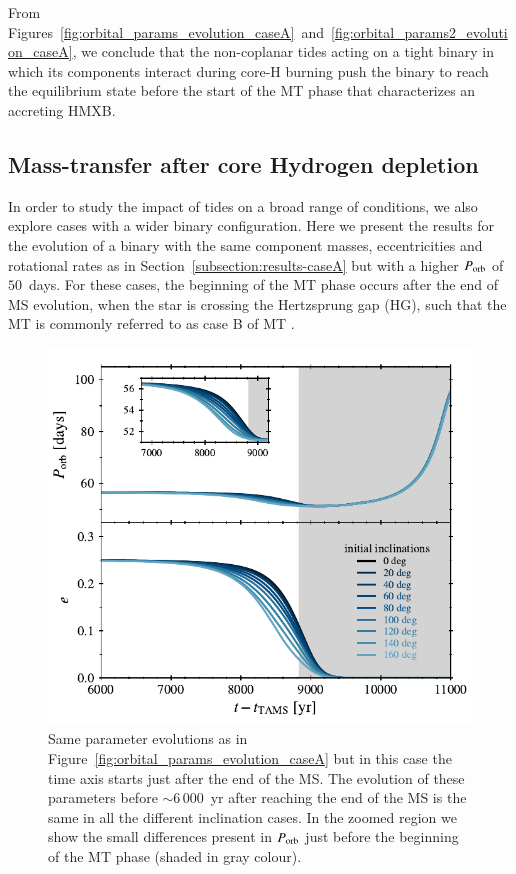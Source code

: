 \documentclass{aa}
\begin{document}
From Figures~\ref{fig:orbital_params_evolution_caseA}~and~\ref{fig:orbital_params2_evolution_caseA}, we conclude that the non-coplanar
tides acting on a tight binary in which its components interact during core-H burning push the binary to reach the equilibrium state before
the start of the MT phase that characterizes an accreting HMXB.

\subsection{Mass-transfer after core Hydrogen depletion}

In order to study the impact of tides on a broad range of conditions, we also explore cases with a wider binary configuration. Here we
present the results for the evolution of a binary with the same component masses, eccentricities and rotational rates as in
Section~\ref{subsection:results-caseA} but with a higher $P_{\rm orb}$ of $50$~days. For these cases, the beginning of the MT phase occurs
after the end of MS evolution, when the star is crossing the Hertzsprung gap (HG), such that the MT is commonly referred to as case B of MT
\citep{kippenhahn1967}.


\begin{figure}
   \centering
   \includegraphics[width=\hsize]{figures/orbital_params_evolution_caseB.pdf}
   \caption{Same parameter evolutions as in Figure~\ref{fig:orbital_params_evolution_caseA} but in this case the time axis starts just
      after the end of the MS. The evolution of these parameters before $\sim$6\,000~yr after reaching the end of the MS is the same in all
      the different  inclination cases. In the zoomed region we show the small differences present in $P_{\rm orb}$ just before the
      beginning of the MT phase (shaded in gray colour).}
   \label{fig:orbital_params_evolution_caseB}
\end{figure}
\end{document}
